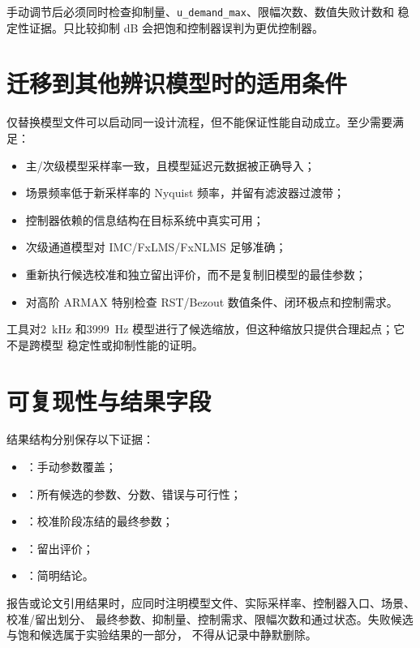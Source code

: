 \documentclass[UTF8,11pt,a4paper]{ctexart}
\begin{document}
手动调节后必须同时检查抑制量、\texttt{u\_demand\_max}、限幅次数、数值失败计数和
稳定性证据。只比较抑制 dB 会把饱和控制器误判为更优控制器。

\section{迁移到其他辨识模型时的适用条件}

仅替换模型文件可以启动同一设计流程，但不能保证性能自动成立。至少需要满足：
\begin{itemize}
  \item 主/次级模型采样率一致，且模型延迟元数据被正确导入；
  \item 场景频率低于新采样率的 Nyquist 频率，并留有滤波器过渡带；
  \item 控制器依赖的信息结构在目标系统中真实可用；
  \item 次级通道模型对 IMC/FxLMS/FxNLMS 足够准确；
  \item 重新执行候选校准和独立留出评价，而不是复制旧模型的最佳参数；
  \item 对高阶 ARMAX 特别检查 RST/Bezout 数值条件、闭环极点和控制需求。
\end{itemize}
工具对2~kHz 和3999~Hz 模型进行了候选缩放，但这种缩放只提供合理起点；它不是跨模型
稳定性或抑制性能的证明。

\section{可复现性与结果字段}

结果结构分别保存以下证据：
\begin{itemize}
  \item {}：手动参数覆盖；
  \item {}：所有候选的参数、分数、错误与可行性；
  \item {}：校准阶段冻结的最终参数；
  \item {}：留出评价；
  \item {}：简明结论。
\end{itemize}

报告或论文引用结果时，应同时注明模型文件、实际采样率、控制器入口、场景、校准/留出划分、
最终参数、抑制量、控制需求、限幅次数和通过状态。失败候选与饱和候选属于实验结果的一部分，
不得从记录中静默删除。
\end{document}
